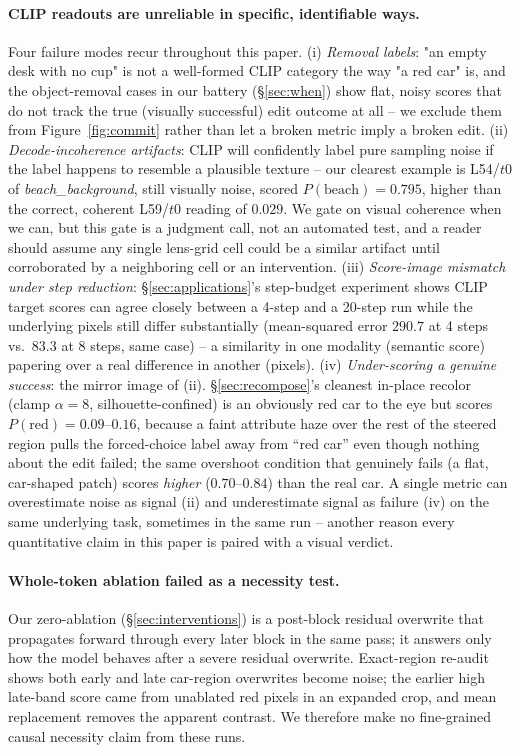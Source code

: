 \documentclass[10pt,twocolumn,letterpaper]{article}
\begin{document}
\paragraph{CLIP readouts are unreliable in specific, identifiable ways.}
Four failure modes recur throughout this paper. (i) \emph{Removal
labels}: "an empty desk with no cup" is not a well-formed CLIP category
the way "a red car" is, and the object-removal cases in our battery
(\S\ref{sec:when}) show flat, noisy scores that do not track the true
(visually successful) edit outcome at all -- we exclude them from
Figure~\ref{fig:commit} rather than let a broken metric imply a broken
edit. (ii) \emph{Decode-incoherence artifacts}: CLIP will confidently
label pure sampling noise if the label happens to resemble a plausible
texture -- our clearest example is L54/$t$0 of \emph{beach\_background},
still visually noise, scored $P(\text{beach})=0.795$, higher than the
correct, coherent L59/$t$0 reading of $0.029$. We gate on visual
coherence when we can, but this gate is a judgment call, not an
automated test, and a reader should assume any single lens-grid cell
could be a similar artifact until corroborated by a neighboring cell or
an intervention. (iii) \emph{Score-image mismatch under step reduction}:
\S\ref{sec:applications}'s step-budget experiment shows CLIP target
scores can agree closely between a 4-step and a 20-step run while the
underlying pixels still differ substantially (mean-squared error
$290.7$ at 4 steps vs.\ $83.3$ at 8 steps, same case) -- a similarity in
one modality (semantic score) papering over a real difference in
another (pixels). (iv) \emph{Under-scoring a genuine success}: the
mirror image of (ii). \S\ref{sec:recompose}'s cleanest in-place recolor
(clamp $\alpha{=}8$, silhouette-confined) is an obviously red car to the
eye but scores $P(\text{red})=0.09$--$0.16$, because a faint attribute
haze over the rest of the steered region pulls the forced-choice label
away from ``red car'' even though nothing about the edit failed; the
same overshoot condition that genuinely fails (a flat, car-shaped patch)
scores \emph{higher} ($0.70$--$0.84$) than the real car. A single metric
can overestimate noise as signal (ii) and underestimate signal as
failure (iv) on the same underlying task, sometimes in the same run --
another reason every quantitative claim in this paper is paired with a
visual verdict.

\paragraph{Whole-token ablation failed as a necessity test.} Our zero-ablation
(\S\ref{sec:interventions}) is a post-block residual overwrite that
propagates forward through every later block in the same pass; it
answers only how the model behaves after a severe residual overwrite.
Exact-region re-audit shows both early and late car-region overwrites
become noise; the earlier high late-band score came from unablated red
pixels in an expanded crop, and mean replacement removes the apparent
contrast. We therefore make no fine-grained causal necessity claim from
these runs.
\end{document}
